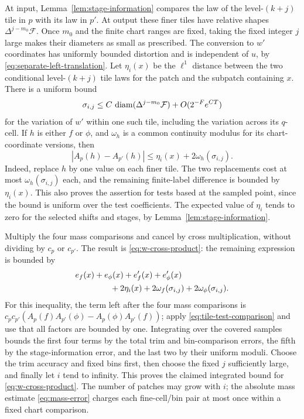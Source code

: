 At input, Lemma~\ref{lem:stage-information} compares the law of
the level-\((k+j)\) tile in \(p\) with its law in \(p'\).
At output these finer tiles have relative shapes
\(\Delta^{j-m_0}\mathcal F\).  Once \(m_0\) and the finite chart
ranges are fixed, taking the fixed integer \(j\) large makes
their diameters as small as prescribed.  The conversion to
\(w'\) coordinates has uniformly bounded distortion and is
independent of \(u\), by
\eqref{eq:separate-left-translation}.
Let \(\eta_i(x)\) be the \(\ell^1\) distance between the two
conditional level-\((k+j)\) tile laws for the patch and the
subpatch containing \(x\).  There is a uniform bound
\[
 \sigma_{i,j}
    \le C\,\operatorname{diam}(\Delta^{j-m_0}\mathcal F)+O(2^{-F}e^{CT})
\]
for the variation of \(w'\) within one such tile, including the
variation across its \(q\)-cell.  If \(h\) is either \(f\) or
\(\phi\), and \(\omega_h\) is a common continuity modulus for its
chart-coordinate versions, then
\begin{equation}\label{eq:tile-test-comparison}
       |A_p(h)-A_{p'}(h)|
                  \le \eta_i(x)+2\omega_h(\sigma_{i,j}).
\end{equation}
Indeed, replace \(h\) by one value on each finer tile.  The two
replacements cost at most \(\omega_h(\sigma_{i,j})\) each, and
the remaining finite-label difference is bounded by \(\eta_i(x)\).
This also proves the assertion for tests based at the sampled
point, since the bound is uniform over the test coefficients.
The expected value of \(\eta_i\) tends to zero for the selected
shifts and stages, by Lemma~\ref{lem:stage-information}.

Multiply the four mass comparisons and cancel by cross
multiplication, without dividing by \(c_p\) or \(c_{p'}\).
The result is \eqref{eq:w-cross-product}: the remaining expression
is bounded by
\[
 \begin{split}
 &e_f(x)+e_\phi(x)+e'_f(x)+e'_\phi(x)\\
 &\hspace{15mm}
       +2\eta_i(x)
       +2\omega_f(\sigma_{i,j})+2\omega_\phi(\sigma_{i,j}).
 \end{split}
\]
For this inequality, the term left after the four mass
comparisons is
\(c_pc_{p'}(A_p(f)A_{p'}(\phi)-A_p(\phi)A_{p'}(f))\);
apply \eqref{eq:tile-test-comparison} and use that all factors
are bounded by one.
Integrating over the covered samples bounds
the first four terms by the total trim and bin-comparison
errors, the fifth by the stage-information error, and the last
two by their uniform moduli.  Choose the trim accuracy and fixed
bins first, then choose the fixed \(j\) sufficiently large, and
finally let \(i\) tend to infinity.
This proves the claimed integrated bound for
\eqref{eq:w-cross-product}.
The number of patches may grow with \(i\); the absolute mass estimate
\eqref{eq:mass-error} charges each fine-cell/bin pair at most
once within a fixed chart comparison.

